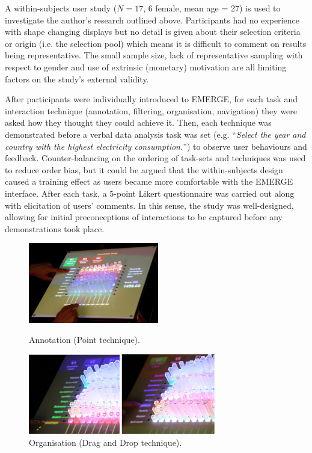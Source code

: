 \documentclass[11pt]{article}
\begin{document}
A within-subjects user study ($N=17$, 6 female, mean age = 27) is used to investigate the author's research outlined above. Participants had no experience with shape changing displays but no detail is given about their selection criteria or origin (i.e. the selection pool) which means it is difficult to comment on results being representative. The small sample size, lack of representative sampling with respect to gender and use of extrinsic (monetary) motivation are all limiting factors on the study's external validity. 

After participants were individually introduced to EMERGE, for each task and interaction technique  (annotation, filtering, organisation, navigation) they were asked how they thought they could achieve it. Then, each technique was demonstrated before a verbal data analysis task was set (e.g. ``\textit{Select the year and country with the highest electricity consumption.}'') to observe user behaviours and feedback. Counter-balancing on the ordering of task-sets and techniques was used to reduce order bias, but it could be argued that the within-subjects design caused a training effect as users became more comfortable with the EMERGE interface. After each task, a 5-point Likert questionnaire was carried out along with elicitation of users' comments. In this sense, the study was well-designed, allowing for initial preconceptions of interactions to be captured before any demonstrations took place.

\begin{figure}[H]
\centering
  \includegraphics[height=3.5cm]{img/taher2015-annotation.png}
  \caption{Annotation (Point technique).}\label{fig:taher2015-annotation}
\endminipage\hfill
{}%
\centering
  \includegraphics[height=3.5cm]{img/taher2015-organize.png}
  \caption{Organisation (Drag and Drop technique).}\label{fig:taher2015-organize}
\endminipage
\end{figure}
\end{document}
